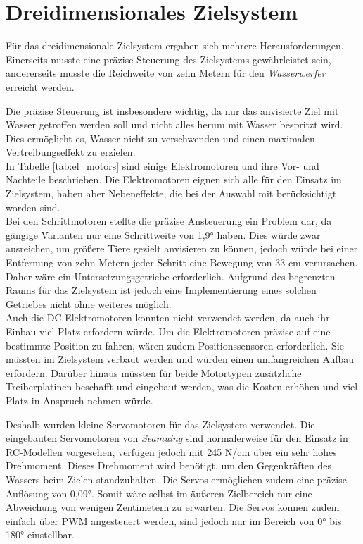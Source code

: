\section{Dreidimensionales Zielsystem} \label{cap:dreidim}

Für das dreidimensionale Zielsystem ergaben sich mehrere Herausforderungen. Einerseits musste eine präzise Steuerung des Zielsystems gewährleistet sein, andererseits musste die Reichweite von zehn Metern für den \textit{Wasserwerfer} erreicht werden.

Die präzise Steuerung ist insbesondere wichtig, da nur das anvisierte Ziel mit Wasser getroffen werden soll und nicht alles herum mit Wasser bespritzt wird. Dies ermöglicht es, Wasser nicht zu verschwenden und einen maximalen Vertreibungseffekt zu erzielen.
\\
In Tabelle \ref{tab:el_motors} sind einige Elektromotoren und ihre Vor- und Nachteile beschrieben. Die Elektromotoren eignen sich alle für den Einsatz im Zielsystem, haben aber Nebeneffekte, die bei der Auswahl mit berücksichtigt worden sind.
\\
Bei den Schrittmotoren stellte die präzise Ansteuerung ein Problem dar, da gängige Varianten nur eine Schrittweite von 1,9° haben. Dies würde zwar ausreichen, um größere Tiere gezielt anvisieren zu können, jedoch würde bei einer Entfernung von zehn Metern jeder Schritt eine Bewegung von 33 cm verursachen. Daher wäre ein Untersetzungsgetriebe erforderlich. Aufgrund des begrenzten Raums für das Zielsystem ist jedoch eine Implementierung eines solchen Getriebes nicht ohne weiteres möglich.
\\
Auch die DC-Elektromotoren konnten nicht verwendet werden, da auch ihr Einbau viel Platz erfordern würde. Um die Elektromotoren präzise auf eine bestimmte Position zu fahren, wären zudem Positionssensoren erforderlich. Sie müssten im Zielsystem verbaut werden und würden einen umfangreichen Aufbau erfordern. Darüber hinaus müssten für beide Motortypen zusätzliche Treiberplatinen beschafft und eingebaut werden, was die Kosten erhöhen und viel Platz in Anspruch nehmen würde.

Deshalb wurden kleine Servomotoren für das Zielsystem verwendet. Die eingebauten Servomotoren von \textit{Seamuing} sind normalerweise für den Einsatz in RC-Modellen vorgesehen, verfügen jedoch mit 245 N/cm über ein sehr hohes Drehmoment. Dieses Drehmoment wird benötigt, um den Gegenkräften des Wassers beim Zielen standzuhalten. Die Servos ermöglichen zudem eine präzise Auflösung von 0,09°. Somit wäre selbst im äußeren Zielbereich nur eine Abweichung von wenigen Zentimetern zu erwarten. Die Servos können zudem einfach über \ac{PWM} angesteuert werden, sind jedoch nur im Bereich von 0° bis 180° einstellbar. \cite{am_servos}

